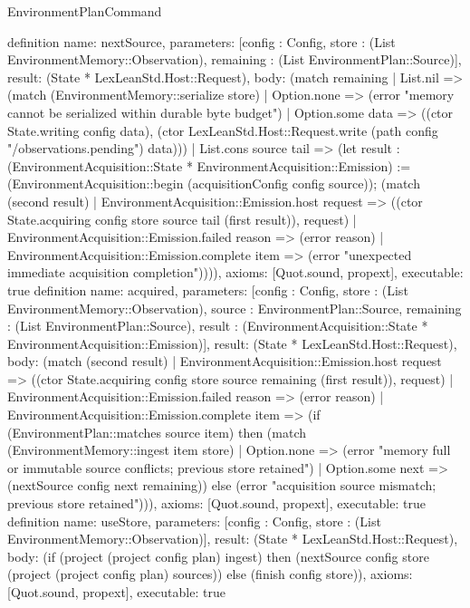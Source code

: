 \begin{lexlean}{EnvironmentPlanCommand}
\begin{semanticmodule}
{}
definition{
 name: nextSource, parameters: [config : Config, store : (List EnvironmentMemory::Observation), remaining : (List EnvironmentPlan::Source)], result: (State * LexLeanStd.Host::Request),
 body: (match remaining | List.nil => (match (EnvironmentMemory::serialize store) | Option.none => (error "memory cannot be serialized within durable byte budget") | Option.some data => ((ctor State.writing config data), (ctor LexLeanStd.Host::Request.write (path config "/observations.pending") data))) | List.cons source tail => (let result : (EnvironmentAcquisition::State * EnvironmentAcquisition::Emission) := (EnvironmentAcquisition::begin (acquisitionConfig config source)); (match (second result) | EnvironmentAcquisition::Emission.host request => ((ctor State.acquiring config store source tail (first result)), request) | EnvironmentAcquisition::Emission.failed reason => (error reason) | EnvironmentAcquisition::Emission.complete item => (error "unexpected immediate acquisition completion")))), axioms: [Quot.sound, propext], executable: true
}
definition{
 name: acquired, parameters: [config : Config, store : (List EnvironmentMemory::Observation), source : EnvironmentPlan::Source, remaining : (List EnvironmentPlan::Source), result : (EnvironmentAcquisition::State * EnvironmentAcquisition::Emission)], result: (State * LexLeanStd.Host::Request),
 body: (match (second result) | EnvironmentAcquisition::Emission.host request => ((ctor State.acquiring config store source remaining (first result)), request) | EnvironmentAcquisition::Emission.failed reason => (error reason) | EnvironmentAcquisition::Emission.complete item => (if (EnvironmentPlan::matches source item) then (match (EnvironmentMemory::ingest item store) | Option.none => (error "memory full or immutable source conflicts; previous store retained") | Option.some next => (nextSource config next remaining)) else (error "acquisition source mismatch; previous store retained"))), axioms: [Quot.sound, propext], executable: true
}
definition{
 name: useStore, parameters: [config : Config, store : (List EnvironmentMemory::Observation)], result: (State * LexLeanStd.Host::Request),
 body: (if (project (project config plan) ingest) then (nextSource config store (project (project config plan) sources)) else (finish config store)), axioms: [Quot.sound, propext], executable: true
}



\end{semanticmodule}
\end{lexlean}
